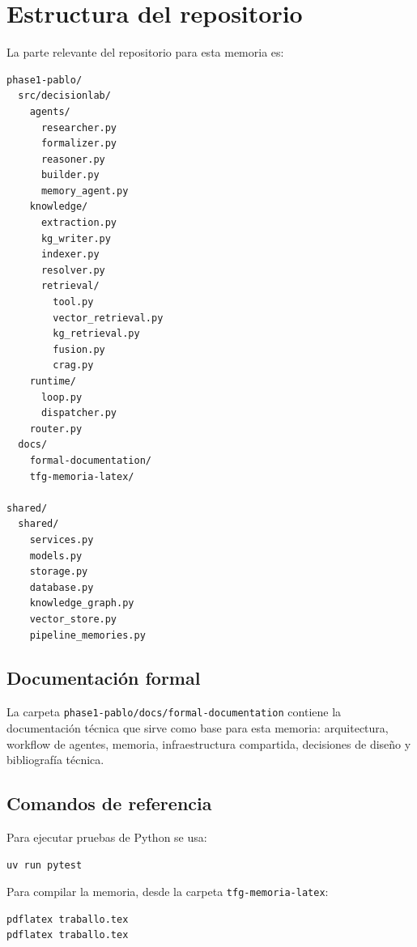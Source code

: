 \chapter{Estructura del repositorio}

La parte relevante del repositorio para esta memoria es:

\begin{verbatim}
phase1-pablo/
  src/decisionlab/
    agents/
      researcher.py
      formalizer.py
      reasoner.py
      builder.py
      memory_agent.py
    knowledge/
      extraction.py
      kg_writer.py
      indexer.py
      resolver.py
      retrieval/
        tool.py
        vector_retrieval.py
        kg_retrieval.py
        fusion.py
        crag.py
    runtime/
      loop.py
      dispatcher.py
    router.py
  docs/
    formal-documentation/
    tfg-memoria-latex/

shared/
  shared/
    services.py
    models.py
    storage.py
    database.py
    knowledge_graph.py
    vector_store.py
    pipeline_memories.py
\end{verbatim}

\section{Documentación formal}

La carpeta \texttt{phase1-pablo/docs/formal-documentation} contiene la
documentación técnica que sirve como base para esta memoria: arquitectura,
workflow de agentes, memoria, infraestructura compartida, decisiones de diseño y
bibliografía técnica.

\section{Comandos de referencia}

Para ejecutar pruebas de Python se usa:

\begin{verbatim}
uv run pytest
\end{verbatim}

Para compilar la memoria, desde la carpeta \texttt{tfg-memoria-latex}:

\begin{verbatim}
pdflatex traballo.tex
pdflatex traballo.tex
\end{verbatim}
